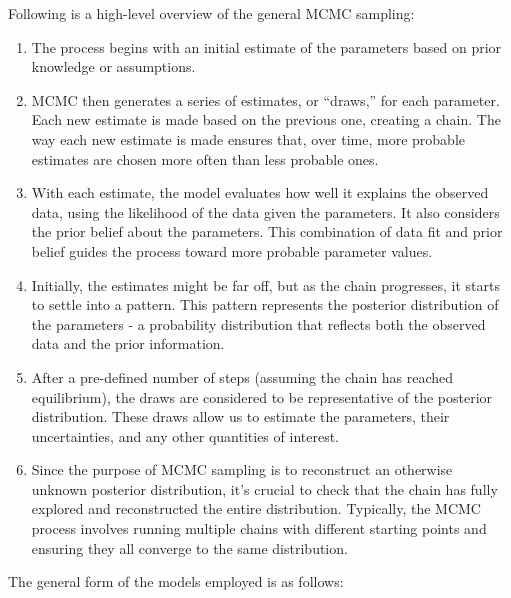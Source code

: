 \documentclass[
  8pt,
  a4paper]{article}
\begin{document}
\begin{tcolorbox}
Following is a high-level overview of the general MCMC sampling:

\begin{enumerate}
\def\labelenumi{\arabic{enumi}.}
\item
  The process begins with an initial estimate of the parameters based on
  prior knowledge or assumptions.
\item
  MCMC then generates a series of estimates, or ``draws,'' for each
  parameter. Each new estimate is made based on the previous one,
  creating a chain. The way each new estimate is made ensures that, over
  time, more probable estimates are chosen more often than less probable
  ones.
\item
  With each estimate, the model evaluates how well it explains the
  observed data, using the likelihood of the data given the parameters.
  It also considers the prior belief about the parameters. This
  combination of data fit and prior belief guides the process toward
  more probable parameter values.
\item
  Initially, the estimates might be far off, but as the chain
  progresses, it starts to settle into a pattern. This pattern
  represents the posterior distribution of the parameters - a
  probability distribution that reflects both the observed data and the
  prior information.
\item
  After a pre-defined number of steps (assuming the chain has reached
  equilibrium), the draws are considered to be representative of the
  posterior distribution. These draws allow us to estimate the
  parameters, their uncertainties, and any other quantities of interest.
\item
  Since the purpose of MCMC sampling is to reconstruct an otherwise
  unknown posterior distribution, it's crucial to check that the chain
  has fully explored and reconstructed the entire distribution.
  Typically, the MCMC process involves running multiple chains with
  different starting points and ensuring they all converge to the same
  distribution.
\end{enumerate}

\end{tcolorbox}

The general form of the models employed is as follows:
\end{document}
